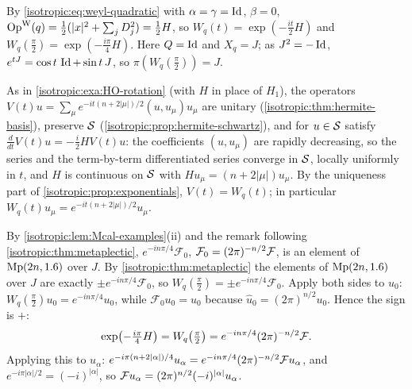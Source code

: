 \subsection*{}

By \eqref{isotropic:eq:weyl-quadratic} with $\alpha=\gamma=\operatorname{Id}$, $\beta=0$,
$\operatorname{Op}^{\mathrm{W}}(q)=\frac12(|x|^2+\sum_jD_j^2)=\frac12H$, so $W_q(t)=\exp(-\frac{it}2H)$ and
$W_q(\frac\pi2)=\exp(-\frac{i\pi}4H)$. Here $Q=\operatorname{Id}$ and $X_q=J$; as $J^2=-\operatorname{Id}$,
$e^{tJ}=\cos t\,\operatorname{Id}+\sin t\,J$, so $\pi(W_q(\frac\pi2))=J$.

As in \cref{isotropic:exa:HO-rotation} (with $H$ in place of $H_1$), the
operators $V(t)u=\sum_\mu e^{-it(n+2|\mu|)/2}(u,u_\mu)u_\mu$ are unitary
(\cref{isotropic:thm:hermite-basis}), preserve $\mathcal{S}$
(\cref{isotropic:prop:hermite-schwartz}), and for $u\in\mathcal{S}$ satisfy
$\frac d{dt}V(t)u=-\frac i2HV(t)u$: the coefficients $(u,u_\mu)$ are rapidly
decreasing, so the series and the term-by-term differentiated series converge in
$\mathcal{S}$, locally uniformly in $t$, and $H$ is continuous on $\mathcal{S}$ with
$Hu_\mu=(n+2|\mu|)u_\mu$. By the uniqueness part of
\cref{isotropic:prop:exponentials}, $V(t)=W_q(t)$; in particular
$W_q(t)u_\mu=e^{-it(n+2|\mu|)/2}u_\mu$.

By \cref{isotropic:lem:Mcal-examples}(ii) and the remark following
\cref{isotropic:thm:metaplectic}, $e^{-in\pi/4}\mathcal F_0$, $\mathcal F_0=(2\pi)^{-n/2}\mathcal{F}$,
is an element of $\mathrm{Mp}(2n,1.6)$ over $J$. By
\cref{isotropic:thm:metaplectic} the elements of $\mathrm{Mp}(2n,1.6)$ over $J$ are
exactly $\pm e^{-in\pi/4}\mathcal F_0$, so $W_q(\frac\pi2)=\pm e^{-in\pi/4}\mathcal F_0$.
Apply both sides to $u_0$: $W_q(\frac\pi2)u_0=e^{-in\pi/4}u_0$, while
$\mathcal F_0u_0=u_0$ because $\hat u_0=(2\pi)^{n/2}u_0$. Hence the sign is $+$:
\begin{equation*}
  \exp\bigl(-\tfrac{i\pi}4H\bigr)=W_q\bigl(\tfrac\pi2\bigr)=e^{-in\pi/4}(2\pi)^{-n/2}\mathcal{F} .
\end{equation*}
Applying this to $u_\alpha$:
$e^{-i\pi(n+2|\alpha|)/4}u_\alpha=e^{-in\pi/4}(2\pi)^{-n/2}\mathcal{F} u_\alpha$, and
$e^{-i\pi|\alpha|/2}=(-i)^{|\alpha|}$, so $\mathcal{F} u_\alpha=(2\pi)^{n/2}(-i)^{|\alpha|}u_\alpha$.

\subsection*{}

